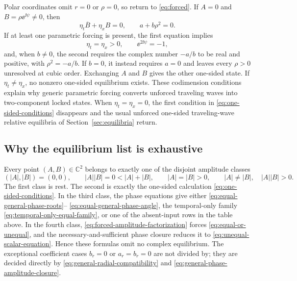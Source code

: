 Polar coordinates omit $r=0$ or $\rho=0$, so return to
\eqref{eq:forced}. If $A=0$ and $B=\rho\ee^{\ii\psi}\ne0$, then
\begin{equation}
 \eta_t\overline B+\eta_xB=0,\qquad
 a+b\rho^2=0.
 \label{eq:one-sided-conditions}
\end{equation}
If at least one parametric forcing is present, the first equation implies
\begin{equation}
 \eta_t=\eta_x>0,\qquad
 \ee^{2\ii\psi}=-1,
 \label{eq:one-sided-phase}
\end{equation}
and, when $b\ne0$, the second requires the complex number $-a/b$ to be real
and positive, with $\rho^2=-a/b$.  If $b=0$, it instead requires $a=0$ and
leaves every $\rho>0$ unresolved at cubic order.  Exchanging $A$ and $B$
gives the other one-sided state.
If $\eta_t\ne\eta_x$, no nonzero one-sided equilibrium exists. These
codimension conditions explain why generic parametric forcing converts
unforced traveling waves into two-component locked states.
When $\eta_t=\eta_x=0$, the first condition in
\eqref{eq:one-sided-conditions} disappears and the usual unforced
one-sided traveling-wave relative equilibria of
Section~\ref{sec:equilibria} return.

\subsection{Why the equilibrium list is exhaustive}

Every point $(A,B)\in\mathbb C^2$ belongs to exactly one of the disjoint
amplitude classes
\begin{equation}
 (|A|,|B|)=(0,0),\qquad
 |A||B|=0<|A|+|B|,\qquad
 |A|=|B|>0,\qquad
 |A|\ne|B|,\quad |A||B|>0.
 \label{eq:forced-exhaustive-partition}
\end{equation}
The first class is rest.  The second is exactly the one-sided calculation
\eqref{eq:one-sided-conditions}.  In the third class, the phase equations
give either \eqref{eq:equal-general-phase-roots}--
\eqref{eq:equal-general-phase-angle}, the temporal-only family
\eqref{eq:temporal-only-equal-family}, or one of the absent-input rows in
the table above.  In the fourth class,
\eqref{eq:forced-amplitude-factorization} forces
\eqref{eq:equal-or-unequal}, and the necessary-and-sufficient phase closure
reduces it to \eqref{eq:unequal-scalar-equation}.  Hence these formulas omit
no complex equilibrium.  The exceptional coefficient cases $b_r=0$ or
$a_r=b_r=0$ are not divided by; they are decided directly by
\eqref{eq:general-radial-compatibility} and
\eqref{eq:general-phase-amplitude-closure}.

